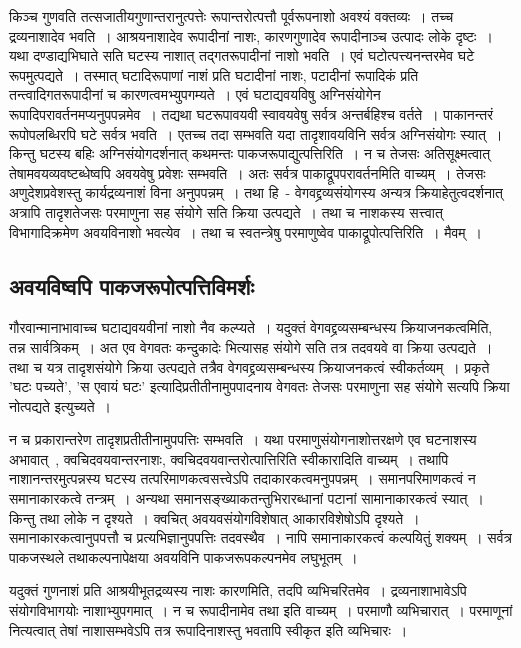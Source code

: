 		किञ्च गुणवति तत्सजातीयगुणान्तरानुत्पत्तेः रूपान्तरोत्पत्तौ पूर्वरूपनाशो अवश्यं वक्तव्यः~। तच्च द्रव्यनाशादेव भवति~। आश्रयनाशादेव रूपादीनां नाशः, कारणगुणादेव रूपादीनाञ्च उत्पादः लोके दृष्टः~। यथा दण्डाद्यभिघाते सति घटस्य नाशात् तद्गतरूपादीनां नाशो भवति~। एवं घटोत्पत्त्यनन्तरमेव घटे रूपमुत्पद्यते~। तस्मात् घटादिरूपाणां नाशं प्रति घटादीनां नाशः, पटादीनां रूपादिकं प्रति तन्त्वादिगतरूपादीनां च कारणत्वमभ्युपगम्यते~। एवं घटाद्यवयविषु अग्निसंयोगेन रूपादिपरावर्तनमप्यनुपपन्नमेव~। तद्यथा घटरूपावयवी स्वावयवेषु सर्वत्र अन्तर्बहिश्च वर्तते~। पाकानन्तरं रूपोपलब्धिरपि घटे सर्वत्र भवति~। एतच्च तदा सम्भवति यदा तादृशावयविनि सर्वत्र अग्निसंयोगः स्यात्~। किन्तु घटस्य बहिः अग्निसंयोगदर्शनात् कथमन्तः पाकजरूपाद्युत्पत्तिरिति~। न च तेजसः अतिसूक्ष्मत्वात् तेषामवयव्यवष्टब्धेष्वपि अवयवेषु प्रवेशः सम्भवति~। अतः सर्वत्र पाकाद्रूपपरावर्तनमिति वाच्यम्~। तेजसः अणुदेशप्रवेशस्तु कार्यद्रव्यनाशं विना अनुपपन्नम्~। तथा हि~- वेगवद्द्रव्यसंयोगस्य अन्यत्र क्रियाहेतुत्वदर्शनात् अत्रापि तादृशतेजसः परमाणुना सह संयोगे सति क्रिया उत्पद्यते~। तथा च नाशकस्य सत्त्वात् विभागादिक्रमेण अवयविनाशो भवत्येव~। तथा च स्वतन्त्रेषु परमाणुष्वेव पाकाद्रूपोत्पत्तिरिति~। मैवम्~।

		\subsection{अवयविष्वपि पाकजरूपोत्पत्तिविमर्शः}

		गौरवान्मानाभावाच्च घटाद्यवयवीनां नाशो नैव कल्प्यते~। यदुक्तं वेगवद्द्रव्यसम्बन्धस्य क्रियाजनकत्वमिति, तन्न सार्वत्रिकम्~। अत एव वेगवतः कन्दुकादेः भित्यासह संयोगे सति तत्र तदवयवे वा क्रिया उत्पद्यते~। तथा च यत्र तादृशसंयोगे क्रिया उत्पद्यते तत्रैव  वेगवद्द्रव्यसम्बन्धस्य क्रियाजनकत्वं स्वीकर्तव्यम्~। प्रकृते 'घटः पच्यते', 'स एवायं घटः' इत्यादिप्रतीतीनामुपपादनाय वेगवतः तेजसः परमाणुना सह संयोगे सत्यपि क्रिया नोत्पद्यते इत्युच्यते~। 

		न च प्रकारान्तरेण तादृशप्रतीतीनामुपपत्तिः सम्भवति~। यथा परमाणुसंयोगनाशोत्तरक्षणे एव घटनाशस्य अभावात्~, क्वचिदवयवान्तरनाशः, क्वचिदवयवान्तरोत्पात्तिरिति स्वीकारादिति वाच्यम्~। तथापि नाशानन्तरमुत्पन्नस्य घटस्य तत्परिमाणकत्वसत्त्वेऽपि तदाकारकत्वमनुपपन्नम्~। समानपरिमाणकत्वं न समानाकारकत्वे तन्त्रम्~। अन्यथा समानसङ्ख्याकतन्तुभिरारब्धानां पटानां सामानाकारकत्वं स्यात्~। किन्तु तथा लोके न दृश्यते~। क्वचित् अवयवसंयोगविशेषात् आकारविशेषोऽपि दृश्यते~। समानाकारकत्वानुपपत्तौ च प्रत्यभिज्ञानुपपत्तिः तदवस्थैव~। नापि समानाकारकत्वं कल्पयितुं शक्यम्~। सर्वत्र पाकजस्थले तथाकल्पनापेक्षया अवयविनि पाकजरूपकल्पनमेव लघुभूतम्~।

		यदुक्तं गुणनाशं प्रति आश्रयीभूतद्रव्यस्य नाशः‌ कारणमिति, तदपि व्यभिचरितमेव~। द्रव्यनाशाभावेऽपि संयोगविभागयोः नाशाभ्युपगमात्~। न च रूपादीनामेव तथा इति वाच्यम्~। परमाणौ व्यभिचारात्~।‌ परमाणूनां नित्यत्वात् तेषां नाशासम्भवेऽपि तत्र रूपादिनाशस्तु भवतापि स्वीकृत इति व्यभिचारः~। 


